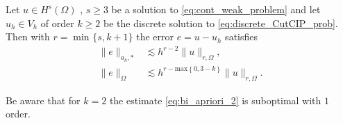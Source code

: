 \begin{theorem}
    \label{thm:apriori_result}
    Let $u \in H^{s}( \Omega ) $ , $s\ge 3$ be a solution to \eqref{eq:cont_weak_problem} and let $u_{h} \in V_{h}$ of order $k\ge 2$ be the discrete solution to \eqref{eq:discrete_CutCIP_prob}. Then with $r = \min_{}\{s, k+1\} $ the error $e = u - u_{h}$ satisfies
    \begin{align}
        \label{eq:bi_apriori_1}
            \| e \|_{ a_{h},* }^{  } &\lesssim   h^{r-2} \| u \|_{ r,\Omega  }^{  },\\
        \label{eq:bi_apriori_2}
        \| e \|_{ \Omega  }^{  } &\lesssim   h^{r-\mathrm{max}\left\{ 0, 3-k \right\} } \| u \|_{ r,\Omega  }^{  }.
    \end{align}

\end{theorem}
\begin{remark}
    Be aware that for $k=2$ the estimate \eqref{eq:bi_apriori_2} is suboptimal with $1$ order.
\end{remark}

